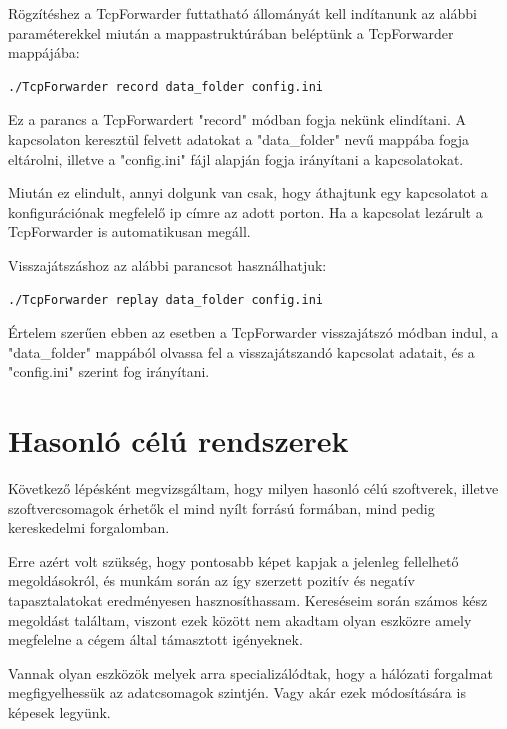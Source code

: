 \documentclass[a4paper,12pt,oneside]{report}
\begin{document}
Rögzítéshez a TcpForwarder futtatható állományát kell indítanunk az alábbi paraméterekkel miután a mappastruktúrában beléptünk a TcpForwarder mappájába:

\begin{lstlisting}
./TcpForwarder record data_folder config.ini
\end{lstlisting}

Ez a parancs a TcpForwardert "record" módban fogja nekünk elindítani. A kapcsolaton keresztül felvett adatokat a "data\_folder" nevű mappába fogja eltárolni, illetve a "config.ini" fájl alapján fogja irányítani a kapcsolatokat.

Miután ez elindult, annyi dolgunk van csak, hogy áthajtunk egy kapcsolatot a konfigurációnak megfelelő ip címre az adott porton.
Ha a kapcsolat lezárult a TcpForwarder is automatikusan megáll.

Visszajátszáshoz az alábbi parancsot használhatjuk:

\begin{lstlisting}
./TcpForwarder replay data_folder config.ini
\end{lstlisting}

Értelem szerűen ebben az esetben a TcpForwarder visszajátszó módban indul, a "data\_folder" mappából olvassa fel a visszajátszandó kapcsolat adatait, és a "config.ini" szerint fog irányítani.

\section{Hasonló célú rendszerek}

Következő lépésként megvizsgáltam, hogy milyen hasonló célú szoftverek, illetve
szoftvercsomagok érhetők el mind nyílt forrású formában, mind pedig kereskedelmi forgalomban.

Erre azért volt szükség, hogy pontosabb képet kapjak a jelenleg fellelhető megoldásokról, és munkám során az így szerzett pozitív és negatív tapasztalatokat eredményesen hasznosíthassam.
Kereséseim során számos kész megoldást találtam, viszont ezek között nem akadtam olyan eszközre amely megfelelne a cégem által támasztott igényeknek.

Vannak olyan eszközök melyek arra specializálódtak, hogy a hálózati forgalmat megfigyelhessük az adatcsomagok szintjén. Vagy akár ezek módosítására is képesek legyünk.
\end{document}
